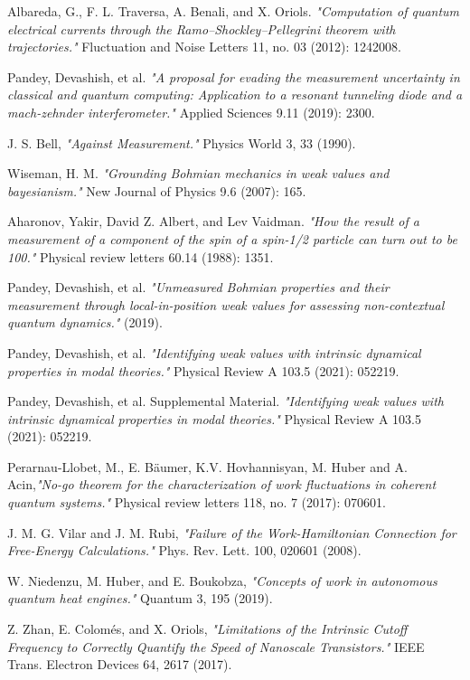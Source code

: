 \documentclass[11pt, a4paper]{article} %
\begin{document}
\begin{thebibliography}{1}
{
Albareda, G., F. L. Traversa, A. Benali, and X. Oriols. {\em "Computation of quantum electrical currents through the Ramo–Shockley–Pellegrini theorem with trajectories."} Fluctuation and Noise Letters 11, no. 03 (2012): 1242008.

Pandey, Devashish, et al. {\em "A proposal for evading the measurement uncertainty in classical and quantum computing: Application to a resonant tunneling diode and a mach-zehnder interferometer."} Applied Sciences 9.11 (2019): 2300.

J. S. Bell, {\em "Against Measurement."} Physics World 3, 33 (1990).

Wiseman, H. M. {\em "Grounding Bohmian mechanics in weak values and bayesianism."} New Journal of Physics 9.6 (2007): 165.

Aharonov, Yakir, David Z. Albert, and Lev Vaidman. {\em "How the result of a measurement of a component of the spin of a spin-1/2 particle can turn out to be 100."} Physical review letters 60.14 (1988): 1351.

Pandey, Devashish, et al. {\em "Unmeasured Bohmian properties and their measurement through local-in-position weak values for assessing non-contextual quantum dynamics."} (2019).

Pandey, Devashish, et al. {\em "Identifying weak values with intrinsic dynamical properties in modal theories."} Physical Review A 103.5 (2021): 052219.

Pandey, Devashish, et al. Supplemental Material. {\em "Identifying weak values with intrinsic dynamical properties in modal theories."} Physical Review A 103.5 (2021): 052219.

Perarnau-Llobet, M., E. Bäumer, K.V. Hovhannisyan, M. Huber and A. Acin,{\em "No-go theorem for the characterization of work fluctuations in coherent quantum systems."} Physical review letters 118, no. 7 (2017): 070601.

J. M. G. Vilar and J. M. Rubi, {\em "Failure of the Work-Hamiltonian Connection for Free-Energy Calculations." }Phys. Rev. Lett. 100, 020601 (2008).

W. Niedenzu, M. Huber, and E. Boukobza, {\em "Concepts of work in autonomous quantum heat engines."} Quantum 3, 195 (2019).

Z. Zhan, E. Colomés, and X. Oriols, {\em  "Limitations of the Intrinsic Cutoff Frequency to Correctly Quantify the Speed of Nanoscale Transistors."} IEEE Trans. Electron Devices 64, 2617 (2017).

}
\end{thebibliography}
\end{document}
